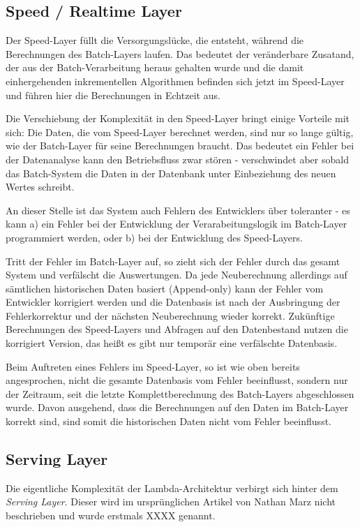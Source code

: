 \documentclass[a4paper,11pt]{scrartcl}
\begin{document}
  \subsection{Speed / Realtime Layer}
  Der Speed-Layer füllt die Versorgungslücke, die entsteht, während die
  Berechnungen des Batch-Layers laufen. Das bedeutet der veränderbare Zusatand,
  der aus der Batch-Verarbeitung heraus gehalten wurde und die damit
  einhergehenden inkrementellen Algorithmen befinden sich jetzt im Speed-Layer
  und führen hier die Berechnungen in Echtzeit aus.

  Die Verschiebung der Komplexität in den Speed-Layer bringt einige Vorteile mit
  sich: Die Daten, die vom Speed-Layer berechnet werden, sind nur so lange
  gültig, wie der Batch-Layer für seine Berechnungen braucht. Das bedeutet ein
  Fehler bei der Datenanalyse kann den Betriebsfluss zwar stören - verschwindet
  aber sobald das Batch-System die Daten in der Datenbank unter Einbeziehung des
  neuen Wertes schreibt.

  An dieser Stelle ist das System auch Fehlern des Entwicklers über toleranter -
  es kann a) ein Fehler bei der Entwicklung der Verarabeitungslogik im
  Batch-Layer programmiert werden, oder b) bei der Entwicklung des Speed-Layers.

  Tritt der Fehler im Batch-Layer auf, so zieht sich der Fehler durch das gesamt
  System und verfälscht die Auswertungen. Da jede Neuberechnung allerdings auf
  sämtlichen historischen Daten basiert (Append-only) kann der Fehler vom
  Entwickler korrigiert werden und die Datenbasis ist nach der Ausbringung der
  Fehlerkorrektur und der nächsten Neuberechnung wieder korrekt. Zukünftige
  Berechnungen des Speed-Layers und Abfragen auf den Datenbestand nutzen die
  korrigiert Version, das heißt es gibt nur temporär eine verfälschte Datenbasis.

  Beim Auftreten eines Fehlers im Speed-Layer, so ist wie oben bereits
  angesprochen, nicht die gesamte Datenbasis vom Fehler beeinflusst, sondern nur
  der Zeitraum, seit die letzte Komplettberechnung des Batch-Layers abgeschlossen
  wurde. Davon ausgehend, dass die Berechnungen auf den Daten im Batch-Layer
  korrekt sind, sind somit die historischen Daten nicht vom Fehler beeinflusst.

  \subsection{Serving Layer}
  Die eigentliche Komplexität der Lambda-Architektur verbirgt sich hinter dem
  \textit{Serving Layer}. Dieser wird im ursprünglichen Artikel von Nathan Marz
  nicht beschrieben und wurde erstmals XXXX genannt. 
\end{document}
